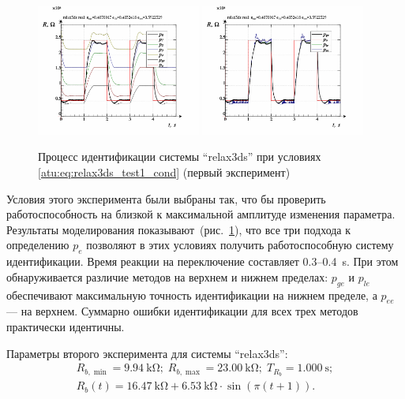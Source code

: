 \begin{figure}[htb!]
  \centerline{
    \includegraphics[width=0.48\textwidth]{p/relax3ds_read_id2_0-p_p.png}
    \hfill
    \includegraphics[width=0.48\textwidth]{p/relax3ds_read_id2_0-p_pp.png}
  }
  \caption{Процесс идентификации системы ``relax3ds'' при условиях \ref{atu:eq:relax3ds_test1_cond} (первый эксперимент)}
  \label{atu:f:relax3ds_id_0}
\end{figure}

Условия этого эксперимента были выбраны так, что бы проверить работоспособность
на близкой к максимальной амплитуде изменения параметра.
Результаты моделирования показывают~(рис.~\ref{atu:f:relax3ds_id_0}), что все три подхода к определению
$p_e$ позволяют в этих условиях получить работоспособную систему идентификации.
Время реакции на переключение составляет 0.3--0.4~s. При этом обнаруживается
различие методов на верхнем и нижнем пределах:
$p_{ge}$ и $p_{le}$ обеспечивают максимальную точность идентификации на нижнем пределе,
а $p_{ee}$ --- на верхнем. Суммарно ошибки идентификации для всех трех методов
практически идентичны.


Параметры второго эксперимента для системы ``relax3ds'':
%
\begin{equation}
  \begin{array}{c}
    R_{b,\min} = \SI{9.94}{\kilo\ohm};
    \;
    R_{b,\max} = \SI{23.00}{\kilo\ohm};
    \;
    T_{R_b} = \SI{1.000}{\second};
  \\
    R_b(t) = \SI{16.47}{\kilo\ohm} + \SI{6.53}{\kilo\ohm} \cdot \sin( \pi ( t + 1 ) ).
  \end{array}
  \label{atu:eq:relax3ds_test2_cond}
\end{equation}

